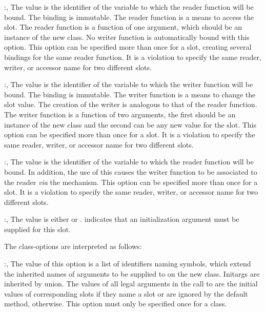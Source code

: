 \begin{optDefinition}
\begin{options}
    \item[\keyworddef{reader}:, \scref{identifier}]%
    The value is the identifier of the variable to which the reader function
    will be bound.  The binding is immutable.  The reader function is a means to
    access the slot.  The reader function is a function of one argument, which
    should be an instance of the new class.  No writer function is automatically
    bound with this option.  This option can be specified more than once for a
    slot, creating several bindings for the same reader function. It is a
    violation to specify the same reader, writer, or accessor name for two
    different slots.

    \item[\keyworddef{writer}:, \scref{identifier}]%
    The value is the identifier of the variable to which the writer function
    will be bound.  The binding is immutable.  The writer function is a means to
    change the slot value.  The creation of the writer is analogous to that of
    the reader function. The writer function is a function of two arguments, the
    first should be an instance of the new class and the second can be any new
    value for the slot.  This option can be specified more than once for a slot.
    It is a violation to specify the same reader, writer, or accessor name
    for two different slots.

    \item[\keyworddef{accessor}:, \scref{identifier}]%
    The value is the identifier of the variable to which the reader function
    will be bound. In addition, the use of this  causes the
    writer function to be associated to the reader {\em via\/} the
     mechanism. This option can be specified more than once
    for a slot. It is a violation to specify the same reader, writer, or
    accessor name for two different slots.

    \item[\keyworddef{required?}:, \scref{boolean}]%
    The value is either \true{} or \nil{}. \true{} indicates that an
    initialization argument must be supplied for this slot.
\end{options}
%
The class-options are interpreted as follows:
%
\begin{options}
    \item[\keyworddef{keywords}:, \scref{list}]%
    The value of this option is a list of identifiers naming symbols, which
    extend the inherited names of arguments to be supplied to 
    on the new class.  Initargs are inherited by union. The values of all legal
    arguments in the call to  are the initial values of
    corresponding slots if they name a slot  or are ignored by
    the default  method, otherwise. This option
    must only be specified once for a class.


\end{options}
\end{optDefinition}
